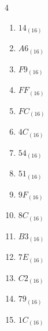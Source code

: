 \begin{multicols}{4}
\begin{enumerate}
        \phantom{$=244$}

  \item $14_{(16)}$

        \phantom{$=20$}

  \item $A6_{(16)}$

        \phantom{$=166$}

  \item $F9_{(16)}$

        \phantom{$=249$}

  \item $FF_{(16)}$

        \phantom{$=255$}

\columnbreak %

\resetques

  \item $FC_{(16)}$

        \phantom{$=252$}

  \item $4C_{(16)}$

        \phantom{$=76$}

  \item $54_{(16)}$

        \phantom{$=84$}

  \item $51_{(16)}$

        \phantom{$=81$}

  \item $9F_{(16)}$

        \phantom{$=159$}

  \item $8C_{(16)}$

        \phantom{$=140$}

  \item $B3_{(16)}$

        \phantom{$=179$}

  \item $7E_{(16)}$

        \phantom{$=126$}

  \item $C2_{(16)}$

        \phantom{$=194$}

  \item $79_{(16)}$

        \phantom{$=121$}

  \item $1C_{(16)}$


\end{enumerate}
\end{multicols}
